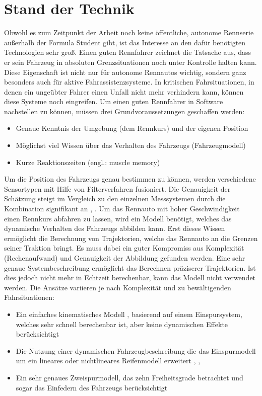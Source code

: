 \documentclass{like}
\begin{document}
\chapter{Stand der Technik}
Obwohl es zum Zeitpunkt der Arbeit noch keine öffentliche, autonome Rennserie außerhalb der Formula Student gibt, ist das Interesse an den dafür benötigten Technologien sehr groß.
Einen guten Rennfahrer zeichnet die Tatsache aus, dass er sein Fahrzeug in absoluten Grenzsituationen noch unter Kontrolle halten kann. Diese Eigenschaft ist nicht nur für autonome Rennautos wichtig, sondern ganz besonders auch für aktive Fahrassistenzsysteme. In kritischen Fahrsituationen, in denen ein ungeübter Fahrer einen Unfall nicht mehr verhindern kann, können diese Systeme noch eingreifen. Um einen guten Rennfahrer in Software nachstellen zu können, müssen drei Grundvoraussetzungen geschaffen werden:
\begin{itemize}
	\item Genaue Kenntnis der Umgebung (dem Rennkurs) und der eigenen Position
	\item Möglichst viel Wissen über das Verhalten des Fahrzeugs (Fahrzeugmodell)
	\item Kurze Reaktionszeiten (engl.: muscle memory)
\end{itemize}

Um die Position des Fahrzeugs genau bestimmen zu können, werden verschiedene Sen\-sor\-ty\-pen mit Hilfe von Filterverfahren fusioniert. Die Genauigkeit der Schätzung steigt im Vergleich zu den einzelnen Messsystemen durch die Kombination signifikant an \cite{GPS_Fusion}, \cite{GPS_IMU_Fusion}.  
\newline
Um das Rennauto mit hoher Geschwindigkeit einen Rennkurs abfahren zu lassen, wird ein Modell benötigt, welches das dynamische Verhalten des Fahrzeugs abbilden kann. Erst dieses Wissen ermöglicht die Berechnung von Trajektorien, welche das Rennauto an die Grenzen seiner Traktion bringt. Es muss dabei ein guter Kompromiss aus Komplexität (Rechenaufwand) und Genauigkeit der Abbildung gefunden werden.
Eine sehr genaue Systembeschreibung ermöglicht das Berechnen präziserer Trajektorien. Ist dies jedoch nicht mehr in Echtzeit berechenbar, kann das Modell nicht verwendet werden.
Die Ansätze variieren je nach Komplexität und zu bewältigenden Fahrsituationen:
\begin{itemize}
	\item Ein einfaches kinematisches Modell \cite{rajamani2011vehicle}, basierend auf einem Einspursystem, welches sehr schnell berechenbar ist, aber keine dynamischen Effekte berücksichtigt
	
	\item Die Nutzung einer dynamischen Fahrzeugbeschreibung die das Einspurmodell um ein lineares oder nichtlineares Reifenmodell erweitert \cite{rc_car_1_43}, \cite{MPC_Dynamic}, \cite{MPC_Dynamic_Tire_Model}
	
	\item Ein sehr genaues Zweispurmodell, das zehn Freiheitsgrade betrachtet und sogar das Einfedern des Fahrzeugs berücksichtigt \cite{doi:10.1137/S0036144502414942} 
\end{itemize}
\end{document}
